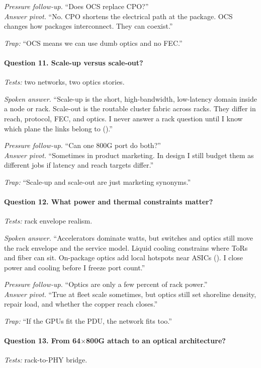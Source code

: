 \textit{Pressure follow-up.} ``Does OCS replace CPO?''\\
\textit{Answer pivot.} ``No. CPO shortens the electrical path at the package.
OCS changes how packages interconnect. They can coexist.''

\textit{Trap:} ``OCS means we can use dumb optics and no FEC.''

\paragraph{Question 11. Scale-up versus scale-out?}
\textit{Tests:} two networks, two optics stories.

\textit{Spoken answer.}
``Scale-up is the short, high-bandwidth, low-latency domain inside a node or
rack. Scale-out is the routable cluster fabric across racks. They differ in
reach, protocol, FEC, and optics. I never answer a rack question until I know
which plane the links belong to ().''

\textit{Pressure follow-up.} ``Can one 800G port do both?''\\
\textit{Answer pivot.} ``Sometimes in product marketing. In design I still
budget them as different jobs if latency and reach targets differ.''

\textit{Trap:} ``Scale-up and scale-out are just marketing synonyms.''

\paragraph{Question 12. What power and thermal constraints matter?}
\textit{Tests:} rack envelope realism.

\textit{Spoken answer.}
``Accelerators dominate watts, but switches and optics still move the rack
envelope and the service model. Liquid cooling constrains where ToRs and fiber
can sit. On-package optics add local hotspots near ASICs
(). I close power and cooling
before I freeze port count.''

\textit{Pressure follow-up.} ``Optics are only a few percent of rack power.''\\
\textit{Answer pivot.} ``True at fleet scale sometimes, but optics still set
shoreline density, repair load, and whether the copper reach closes.''

\textit{Trap:} ``If the GPUs fit the PDU, the network fits too.''

\paragraph{Question 13. From 64$\times$800G attach to an optical architecture?}
\textit{Tests:} rack-to-PHY bridge.

